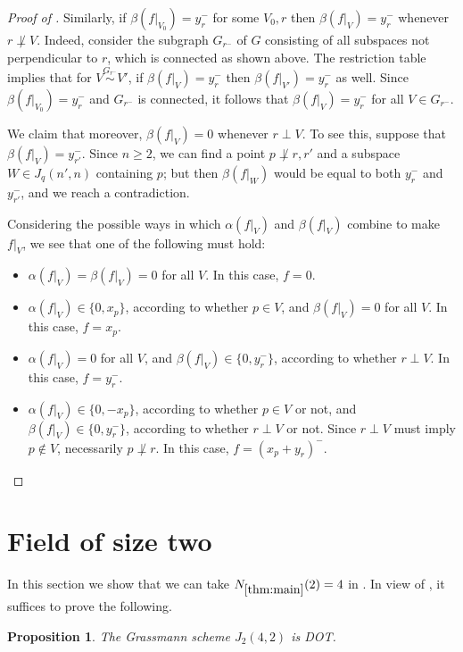 \documentclass{article}
\newtheorem{proposition}[theorem]{Proposition}
\theoremstyle{definition}
\providecommand{\Nmain}{N_{\ref{thm:main}}}
\begin{document}
\begin{proof}[Proof of ]
Similarly, if $\beta(f|_{V_0}) = y_r^-$ for some $V_0,r$ then $\beta(f|_V) = y_r^-$ whenever $r \not\perp V$.
Indeed, consider the subgraph $G_{r^-}$ of $G$ consisting of all subspaces not perpendicular to $r$, which is connected as shown above. The restriction table implies that for $V \stackrel{G_{r^-}}\sim V'$, if $\beta(f|_V) = y_r^-$ then $\beta(f|_{V'}) = y_r^-$ as well. Since $\beta(f|_{V_0}) = y_r^-$ and $G_{r^-}$ is connected, it follows that $\beta(f|_V) = y_r^-$ for all $V \in G_{r^-}$.

We claim that moreover, $\beta(f|_V) = 0$ whenever $r \perp V$. To see this, suppose that $\beta(f|_V) = y_{r'}^-$. Since $n \ge 2$, we can find a point $p \not\perp r,r'$ and a subspace $W \in J_q(n',n)$ containing $p$; but then $\beta(f|_W)$ would be equal to both $y_r^-$ and $y_{r'}^-$, and we reach a contradiction.

Considering the possible ways in which $\alpha(f|_V)$ and $\beta(f|_V)$ combine to make $f|_V$, we see that one of the following must hold:
\begin{itemize}
\item $\alpha(f|_V) = \beta(f|_V) = 0$ for all $V$. In this case, $f = 0$.
\item $\alpha(f|_V) \in \{0, x_p\}$, according to whether $p \in V$, and $\beta(f|_V) = 0$ for all $V$. In this case, $f = x_p$.
\item $\alpha(f|_V) = 0$ for all $V$, and $\beta(f|_V) \in \{0, y_r^-\}$, according to whether $r \perp V$. In this case, $f = y_r^-$.
\item $\alpha(f|_V) \in \{0, -x_p\}$, according to whether $p \in V$ or not, and $\beta(f|_V) \in \{0, y_r^-\}$, according to whether $r \perp V$ or not. Since $r \perp V$ must imply $p \notin V$, necessarily $p \not\perp r$. In this case, $f = (x_p + y_r)^-$. \qedhere
\end{itemize}
\end{proof}

\section{Field of size two}
\label{sec:F2}

In this section we show that we can take $\Nmain(2) = 4$ in . In view of , it suffices to prove the following.

\begin{proposition} \label{pro:F2}
The Grassmann scheme $J_2(4,2)$ is DOT.
\end{proposition}
\end{document}
